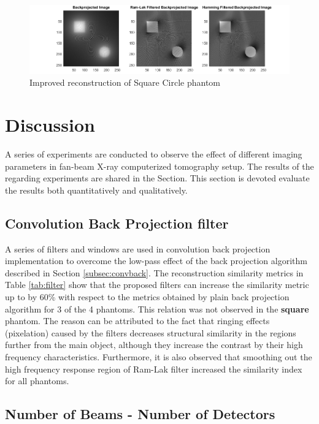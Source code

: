 \documentclass[journal]{IEEEtran}
\begin{document}
\begin{figure}[h]
	\centering
	\includegraphics[width=\columnwidth,height=.12\textheight]{images/sqcircimproved.png}
	\caption{Improved reconstruction of Square Circle phantom}\label{fig:sqcircimproved}
\end{figure}
\newpage
\section{Discussion} \label{sec:discuss}

A series of experiments are conducted to observe the effect of different imaging parameters in fan-beam X-ray computerized tomography setup. The results of the regarding experiments are shared in the  Section. This section is devoted evaluate the results both quantitatively and qualitatively.
\subsection{Convolution Back Projection filter}

A series of filters and windows are used in convolution back projection implementation to overcome the low-pass effect of the back projection algorithm described in Section \ref{subsec:convback}. The reconstruction similarity metrics in Table \ref{tab:filter} show that the proposed filters can increase the similarity metric up to by 60\% with respect to the metrics obtained by plain back projection algorithm for 3 of the 4 phantoms. This relation was not observed in the \textbf{square} phantom. The reason can be attributed to the fact that ringing effects (pixelation) caused by the filters decreases structural similarity in the regions further from the main object, although they increase the contrast by their high frequency characteristics. Furthermore, it is also observed that smoothing out the high frequency response region of Ram-Lak filter increased the similarity index for all phantoms.
\subsection{Number of Beams - Number of Detectors} \label{subsec:beams}
\end{document}
